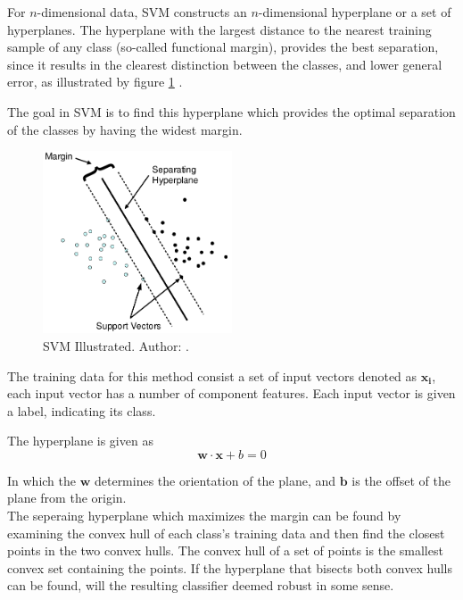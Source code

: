 For \(n\)-dimensional data,
SVM constructs an \(n\)-dimensional hyperplane or a set of hyperplanes.
The hyperplane with the largest distance to the nearest training sample
of any class (so-called functional margin), provides the best separation,
since it results in the clearest distinction between the classes,
and lower general error,
as illustrated by figure \ref{fig::SVM-illustrated} \citep{svmwiki}.

The goal in SVM is to find this hyperplane which provides the optimal separation 
of the classes by having the widest margin. 

\begin{figure}[h]
\centering
\includegraphics[width = 0.5\textwidth]{img/SVM-illu.png}
\caption[SVM Illustrated]{SVM Illustrated. Author: \citep{svmwiki}.}
\label{fig::SVM-illustrated}
\end{figure}

The training data for this method consist a set of input vectors denoted as 
$\mathbf{x_i}$, each input vector has a number of component features. Each input 
vector is given a label, indicating its class.

The hyperplane is given as 
\begin{equation}
\mathbf{w} \cdot \mathbf{x} + b = 0
\end{equation}

In which the $\mathbf{w}$ determines the orientation of the plane, and 
$\mathbf{b}$ is the offset of the plane from the origin. \\
 
The seperaing hyperplane which maximizes the margin can be found by examining 
the convex hull of each class’s training data  and then find the closest points 
in the two convex hulls. The convex hull of a set of points is the
smallest convex set containing the points.  If the hyperplane that bisects both 
convex hulls can be found, will the resulting classifier deemed robust in some 
sense. 

